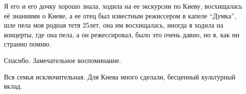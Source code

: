  
 
 
 
 


Я его и его дочку хорошо знала, ходила на ее экскурсии по Киеву, восхищалась её
знаниями о Киеве, а ее отец был известным режиссером в капеле \enquote{Думка}, шле пела
моя родная тетя 25лет, она им восхищалась, иногда я ходила на концерты, где она
пела, а он режессировал, было это очень давно, но я, как ни странно помню.


Спасибо. Замечательное воспоминание.

Вся семья исключительная. Для Киева много сделали, бесценный культурный вклад.
